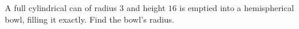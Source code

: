 A full cylindrical can of radius $3$ and height $16$ is emptied into a hemispherical bowl, filling it exactly. Find the bowl's radius.
